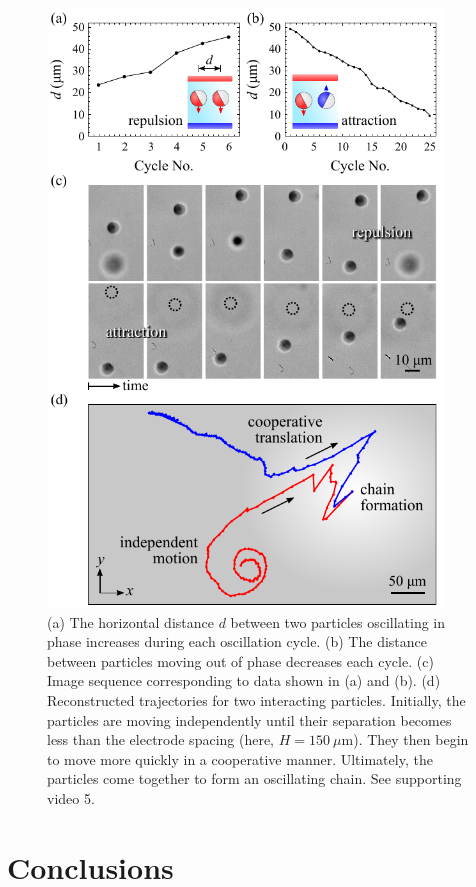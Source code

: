 \begin{figure}[p]
\centering
\includegraphics[width=10.5cm]{figures/2_5.pdf}
\caption{(a) The horizontal distance $d$ between two particles oscillating in phase increases during each oscillation cycle. (b) The distance between particles moving out of phase decreases each cycle. (c) Image sequence corresponding to data shown in (a) and (b). (d) Reconstructed trajectories for two interacting particles.  Initially, the particles are moving independently until their separation becomes less than the electrode spacing (here, $H=150~\mu\text{m}$). They then begin to move more quickly in a cooperative manner.  Ultimately, the particles come together to form an oscillating chain. See supporting video 5.}
\label{fig:5}
\end{figure}



\section{Conclusions}

